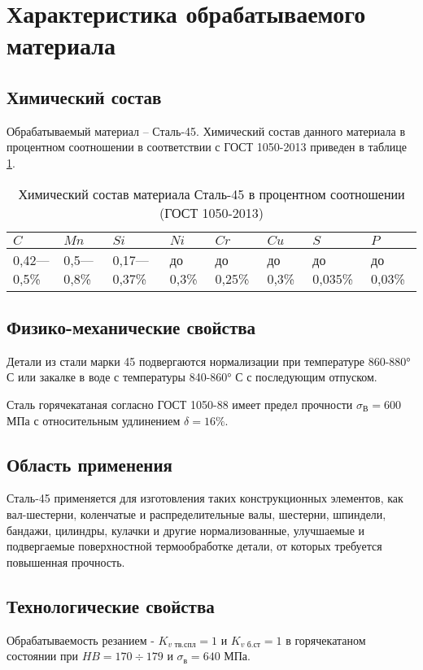 \section{Характеристика обрабатываемого материала}

\subsection{Химический состав}

Обрабатываемый материал – Сталь-45. Химический состав данного материала в процентном соотношении в соответствии с ГОСТ 1050-2013 приведен в таблице \ref{tab:nigger}.

\begin{table}[H]
    \centering
    \caption[]{Химический состав материала Сталь-45 в процентном соотношении (ГОСТ 1050-2013)}
    \label{tab:nigger}
    \begin{tabular}{|p{1.5cm}|p{1.5cm}|p{1.5cm}|p{1.5cm}|p{1.5cm}|p{1.5cm}|p{1.5cm}|p{1.5cm}|}
        \hline \textbf{$C$} & \textbf{$Mn$} & \textbf{$Si$} & \textbf{$Ni$} & \textbf{$Cr$} & \textbf{$Cu$} & \textbf{$S$} & \textbf{$P$} \\
        \hline 0,42—0,5\%   & 0,5—0,8\%     & 0,17—0,37\%   & до 0,3\%      & до 0,25\%     & до 0,3\%      & до 0,035\%    & до 0,03\% \\
        \hline
    \end{tabular}
\end{table}


\subsection{Физико-механические свойства}

Детали из стали марки 45 подвергаются нормализации при температуре 860-880° С или закалке в воде с температуры 840-860° С с последующим отпуском.\cite{site-stal-45}

Сталь горячекатаная согласно ГОСТ 1050-88 имеет предел прочности $\sigma_\textit{В}=600$ МПа с относительным удлинением $\delta=16\%$.


\subsection{Область применения}

Сталь-45 применяется для изготовления таких конструкционных элементов, как вал-шестерни, коленчатые и распределительные валы, шестерни, шпиндели, бандажи, цилиндры, кулачки и другие нормализованные, улучшаемые и подвергаемые поверхностной термообработке детали, от которых требуется повышенная прочность.\cite{site-stal-45}


\subsection{Технологические свойства}

Обрабатываемость резанием - $K_\textit{v тв.спл} = 1$ и $K_\textit{v б.ст} = 1$ в горячекатаном состоянии при $H\!B = 170 \div 179$ и $\sigma_\textit{в} = 640$ МПа.


